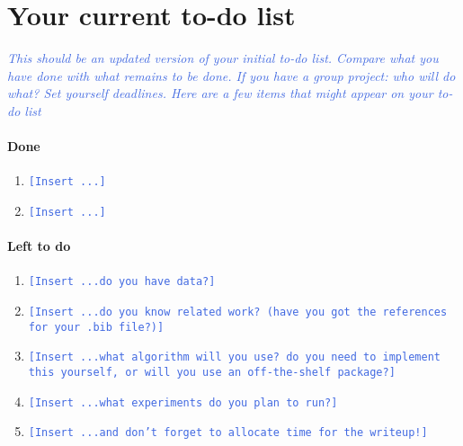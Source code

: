 \documentclass[11pt,letterpaper]{article}
\newcommand{\blue}[1]{\textcolor{RoyalBlue}{#1}}
\newcommand{\fillme}[1]{\blue{\texttt{[Insert #1]}}}
\newcommand{\instructions}[1]{\blue{\textit{#1}}}
\begin{document}
\section*{Your current to-do list}
\instructions{This should be an updated version of your initial to-do
  list. Compare what you have done with what remains to be done. If you have a group
  project: who will do what? Set yourself deadlines. Here are a few
  items that might appear on your to-do list}
\paragraph{Done}
\begin{enumerate}
\item \fillme{...}
\item \fillme{...}
\end{enumerate}
\paragraph{Left to do}
\begin{enumerate}
\item \fillme{...do you have data?}
\item \fillme{...do you know related work? (have you got the
    references  for your .bib file?)}
\item \fillme{...what algorithm will you use? do you need to implement
    this yourself, or will you use an off-the-shelf package?} 
\item \fillme{...what experiments do you plan to run?}
\item \fillme{...and don't forget to allocate time for the writeup!} 
\end{enumerate}


  
\end{document}
